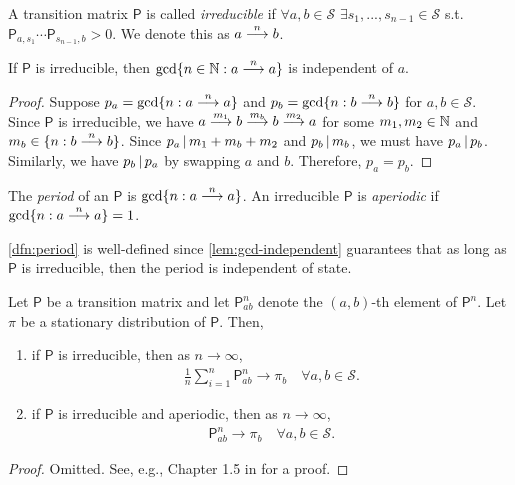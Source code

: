 \documentclass[a4paper]{article}
\begin{document}
\begin{definition}[Irreducible]
	A transition matrix $\mathsf{P}$ is called \emph{irreducible}
	if $\forall a,b\in\mathcal{S}$ $\exists s_1,...,s_{n-1}\in\mathcal{S}$ s.t.\ $\mathsf{P}_{a,s_1}\cdots\mathsf{P}_{s_{n-1},b}>0$.
	We denote this as $a\nto b$.
\end{definition}

\begin{lemma}\label{lem:gcd-independent}
	If $\mathsf{P}$ is irreducible, then $\gcd\{n\in\naturals:a\nto a\}$ is independent of $a$.
\end{lemma}
\begin{proof}
	Suppose $p_a=\gcd\{n:a\nto a\}$ and $p_b=\gcd\{n:b\nto b\}$ for $a,b\in\mathcal{S}$.
	Since $\mathsf{P}$ is irreducible,
	we have $a\nto[m_1]b\nto[m_b]b\nto[m_2]a$ for some $m_1,m_2\in\naturals$ and $m_b\in\{n:b\nto b\}$.
	Since $p_a\divides m_1+m_b+m_2$ and $p_b\divides m_b$, we must have $p_a\divides p_b$.
	Similarly, we have $p_b\divides p_a$ by swapping $a$ and $b$.
	Therefore, $p_a=p_b$.
\end{proof}

\begin{definition}[Period]\label{dfn:period}
	The \emph{period} of an $\mathsf{P}$ is $\gcd\{n:a\nto a\}$.
	An irreducible $\mathsf{P}$ is \emph{aperiodic} if $\gcd\{n:a\nto a\}=1$.
\end{definition}

\begin{remark}
	\autoref{dfn:period} is well-defined since
	\autoref{lem:gcd-independent} guarantees that as long as $\mathsf{P}$ is irreducible,
	then the period is independent of state.
\end{remark}

\begin{theorem}\label{thm:ergodicity-for-markov-chains}
	Let $\mathsf{P}$ be a transition matrix and let $\mathsf{P}_{ab}^{n}$ denote the $(a,b)$-th element of $\mathsf{P}^n$.
	Let $\pi$ be a stationary distribution of $\mathsf{P}$.
	Then,
	\begin{enumerate}
		\item
			if $\mathsf{P}$ is irreducible, then as $n\to\infty$,
			\begin{align*}
				\frac1n \sum_{i=1}^{n} \mathsf{P}_{ab}^{n} \to \pi_{b} \quad\forall a,b\in\mathcal{S}.
			\end{align*}
		\item
			if $\mathsf{P}$ is irreducible and aperiodic, then as $n\to\infty$,
			\begin{align*}
				\mathsf{P}_{ab}^{n} \to \pi_{b} \quad\forall a,b\in\mathcal{S}.
			\end{align*}
	\end{enumerate}
\end{theorem}
\begin{proof}
	Omitted.
	See, e.g., Chapter 1.5 in \cite{sarig-2023} for a proof.
\end{proof}
\end{document}
